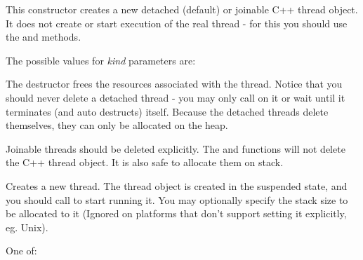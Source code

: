 
\label{wxthreadctor}


This constructor creates a new detached (default) or joinable C++ thread object. It
does not create or start execution of the real thread - for this you should
use the  and  methods.

The possible values for {\it kind} parameters are:

\twocolwidtha{7cm}
\begin{twocollist}\itemsep=0pt
\end{twocollist}



The destructor frees the resources associated with the thread. Notice that you
should never delete a detached thread - you may only call 
 on it or wait until it terminates (and auto
destructs) itself. Because the detached threads delete themselves, they can
only be allocated on the heap.

Joinable threads should be deleted explicitly. The  and  functions
will not delete the C++ thread object. It is also safe to allocate them on
stack.

\label{wxthreadcreate}


Creates a new thread. The thread object is created in the suspended state, and you
should call  to start running it.  You may optionally
specify the stack size to be allocated to it (Ignored on platforms that don't
support setting it explicitly, eg. Unix).


One of:

\twocolwidtha{7cm}
\begin{twocollist}\itemsep=0pt
\end{twocollist}

